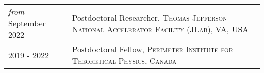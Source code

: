 \vspace*{-1.6cm}
\begin{longtable}{R{2.5cm}|p{14.8cm}}
	\textit{from} September 2022 & Postdoctoral Researcher, \textsc{Thomas Jefferson National Accelerator Facility (JLab), VA, USA} \\
 	2019 - 2022 & Postdoctoral Fellow, \textsc{Perimeter Institute for Theoretical Physics, Canada} \\
\end{longtable}
